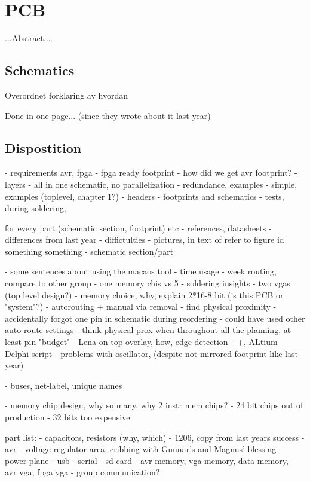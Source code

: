 \chapter {PCB}

...Abstract...

\section {Schematics}

Overordnet forklaring av hvordan

Done in one page... (since they wrote about it last year)

\section {Dispostition}
- requirements avr, fpga
	- fpga ready footprint
	- how did we get avr footprint?
- layers
- all in one schematic, no parallelization
- redundance, examples
- simple, examples (toplevel, chapter 1?)
- headers
- footprints and schematics
- tests, during soldering, 

for every part (schematic section, footprint) etc
	- references, datasheets
	- differences from last year
	- diffictulties
	- pictures, in text of refer to figure id something something
	- schematic section/part

- some sentences about using the macaos tool
- time usage
	- week routing, compare to other group
	- one memory chis vs 5
- soldering insights
- two vgas (top level design?)
- memory choice, why, explain 2*16-8 bit (is this PCB or "system"?)
- autorouting + manual via removal
	- find physical proximity
	- accidentally forgot one pin in schematic during reordering
	- could have used other auto-route settings
	- think physical prox when throughout all the planning, at least pin "budget"
- Lena on top overlay, how, edge detection ++, ALtium Delphi-script
- problems with oscillator, (despite not mirrored footprint like last year)

- buses, net-label, unique names

- memory chip design, why so many, why 2 instr mem chips?
	- 24 bit chips out of production
	- 32 bits too expensive


part list:
- capacitors, resistors (why, which)
	- 1206, copy from last years success
- avr
- voltage regulator area, cribbing with Gunnar's and Magnus' blessing
- power plane
- usb
- serial
- sd card
- avr memory, vga memory, data memory, 
- avr vga, fpga vga
- group communication?

